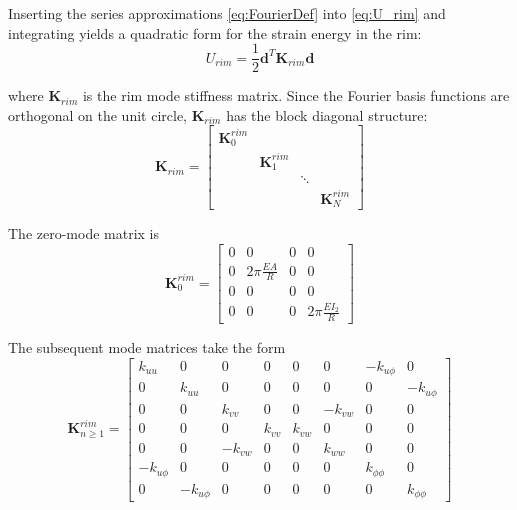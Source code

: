 \documentclass[\rootdir/thesis.tex]{subfiles}
\begin{document}
Inserting the series approximations \eqref{eq:FourierDef} into \eqref{eq:U_rim} and integrating yields a quadratic form for the strain energy in the rim:
\begin{equation}
\label{eq:mm_U_rim}
U_{rim} = \frac{1}{2} \mathbf{d}^T \mathbf{K}_{rim} \mathbf{d}
\end{equation}

where $\mathbf{K}_{rim}$ is the rim mode stiffness matrix. Since the Fourier basis functions are orthogonal on the unit circle, $\mathbf{K}_{rim}$ has the block diagonal structure:
\begin{equation}
\label{eq:mm_K_rim}
\mathbf{K}_{rim} =
\begin{bmatrix}
\mathbf{K}_0^{rim} & & &\\
& \mathbf{K}_1^{rim} & &\\
& & \ddots &\\
& & & \mathbf{K}_N^{rim}
\end{bmatrix}
\end{equation}

The zero-mode matrix is
\begin{equation}
\mathbf{K}_0^{rim} =
\begin{bmatrix}
0 & 0 & 0 & 0\\
0 & 2\pi \frac{EA}{R} & 0 & 0\\
0 & 0 & 0 & 0\\
0 & 0 & 0 & 2\pi \frac{EI_2}{R}
\end{bmatrix}
\end{equation}

The subsequent mode matrices take the form
\begin{equation}
\mathbf{K}_{n\geq 1}^{rim} =
\begin{bmatrix}
k_{uu} & 0 & 0 & 0 & 0 & 0 & -k_{u\phi} & 0\\
0 & k_{uu} & 0 & 0 & 0 & 0 & 0 & -k_{u\phi}\\
0 & 0 & k_{vv} & 0 & 0 & -k_{vw} & 0 & 0\\
0 & 0 & 0 & k_{vv} & k_{vw} & 0 & 0 & 0\\
0 & 0 & -k_{vw} & 0 & 0 & k_{ww} & 0 & 0\\
-k_{u\phi} & 0 & 0 & 0 & 0 & 0 & k_{\phi\phi} & 0\\
0 & -k_{u\phi} & 0 & 0 & 0 & 0 & 0 & k_{\phi\phi}
\end{bmatrix}
\end{equation}
\end{document}

